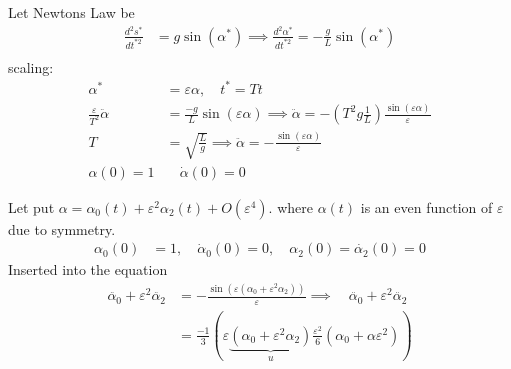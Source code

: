 \documentclass{article}
\theoremstyle{remark}
\begin{document}
Let Newtons Law be \[
  \begin{split}
   \frac{d ^2 s ^{*}}{d t^{*2}}   & = g \sin \left( \alpha ^{*} \right) \implies   \frac{d ^2 \alpha ^{*}}{d t^{*2}}  = -\frac{g}{L} \sin\left( \alpha ^{*} \right) \\
  \end{split} 
\] 
scaling: 
\[
  \begin{split}
   \alpha ^{*}  & = \varepsilon \alpha , \quad  t^{* }   = Tt   \\
   \frac{\varepsilon }{T^2} \ddot{\alpha }  & = \frac{-g}{L}  \sin \left( \varepsilon \alpha  \right) \implies  \ddot{\alpha } = - \left( T^2 g \frac{1}{ L}  \right) \frac{\sin \left( \varepsilon \alpha  \right)}{ \varepsilon } \\
   T &= \sqrt{\frac{L}{g} }  \implies  \ddot{\alpha }   = - \frac{\sin \left( \varepsilon \alpha  \right)}{\varepsilon }  \\ 
   \alpha \left( 0 \right) = 1  &  \quad  \dot{\alpha } \left( 0 \right) = 0 
  \end{split} 
\] 

Let put $\alpha  = \alpha _{0} \left( t \right) + \varepsilon ^2 \alpha _{2} \left( t \right) + O\left( \varepsilon ^{4} \right)$. where $\alpha \left( t \right)$ is an even function of $\varepsilon $ due to symmetry. \[
  \begin{split}
\alpha _{0} \left( 0 \right) &=  1, \quad  \dot{\alpha }_{0} \left( 0 \right) = 0, \quad  \alpha _{2} \left( 0 \right) = \dot{\alpha _{2} } \left( 0 \right) = 0  
  \end{split} 
\] 
Inserted into the equation \[
  \begin{split}
    \ddot{\alpha _{0}} + \varepsilon ^2 \ddot{\alpha _{2}}  & = - \frac{\sin \left( \varepsilon \left( \alpha _{0} + \varepsilon ^2 \alpha _{2} \right) \right)}{\varepsilon }  \implies \quad \ddot{\alpha _{0}} + \varepsilon ^2 \ddot{\alpha _{2}} \\
     & = \frac{-1}{3}  \left( \varepsilon \underbrace{\left( \alpha _{0} + \varepsilon ^2 \alpha _{2} \right)} _{u} \frac{\varepsilon ^2}{6}  \left( \alpha _{0}  + \alpha \varepsilon ^2 \right) \right)
  \end{split} 
\] 
\end{document}
